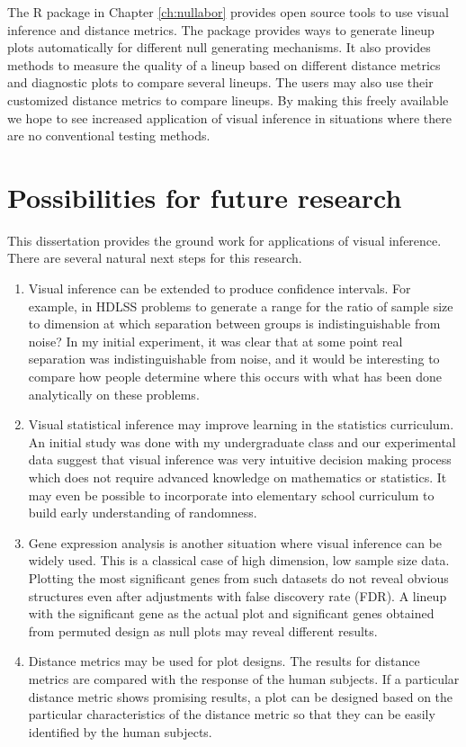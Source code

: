 The R package in Chapter \ref{ch:nullabor} provides open source tools to use visual inference and distance metrics. The package provides ways to generate lineup plots automatically for different null generating mechanisms. It also provides methods to measure the quality of a lineup based on different distance metrics and diagnostic plots to compare several lineups. The users may also use their customized distance metrics to compare lineups. By making this freely available we hope  to see increased application of visual inference in situations where there are no conventional testing methods.

\section{Possibilities for future research}

This dissertation provides the ground work for applications of visual inference. There are several natural next steps for this research. 

\begin{enumerate} 
\item Visual inference can be extended to produce confidence intervals. For example, in HDLSS problems to generate a range for the ratio of sample size to dimension at which separation between groups is indistinguishable from noise? In my initial experiment, it was clear that at some point real separation was indistinguishable from noise, and it would be interesting to compare how people determine where this occurs with what has been done analytically on these problems.  
\item Visual statistical inference may improve learning in the statistics curriculum. An initial study was done with my undergraduate class and our experimental data suggest that visual inference was very intuitive decision making process which does not require advanced knowledge on mathematics or statistics. It may even be possible to incorporate into elementary school curriculum to build early understanding of randomness. 
\item Gene expression analysis is another situation where visual inference can be widely used. This is a classical case of high dimension, low sample size data. Plotting the most significant genes from such datasets do not reveal obvious structures even after adjustments with false discovery rate (FDR). A lineup with the significant gene as the actual plot and significant genes obtained from permuted design as null plots may reveal different results.
\item  Distance metrics may be used for plot designs. The results for distance metrics are compared with the response of the human subjects. If a particular distance metric shows promising results, a plot can be designed based on the particular characteristics of the distance metric so that they can be easily identified by the human subjects.
\end{enumerate}